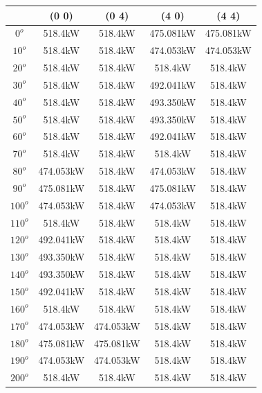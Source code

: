         \singlespacing
        \begin{table}[H]
        	\centering
        	\begin{tabular}{|c|c|c|c|c|} \hline
        			& (0 0)		& (0 4)		& (4 0)		& (4 4)		\\ \hline
        		$0^o$	& 518.4kW	& 518.4kW	& 475.081kW	& 475.081kW	\\ \hline
        		$10^o$	& 518.4kW	& 518.4kW	& 474.053kW	& 474.053kW	\\ \hline
        		$20^o$	& 518.4kW	& 518.4kW	& 518.4kW	& 518.4kW	\\ \hline
        		$30^o$	& 518.4kW	& 518.4kW	& 492.041kW	& 518.4kW	\\ \hline
        		$40^o$	& 518.4kW	& 518.4kW	& 493.350kW	& 518.4kW	\\ \hline
        		$50^o$	& 518.4kW	& 518.4kW	& 493.350kW	& 518.4kW	\\ \hline
        		$60^o$	& 518.4kW	& 518.4kW	& 492.041kW	& 518.4kW	\\ \hline
        		$70^o$	& 518.4kW	& 518.4kW	& 518.4kW	& 518.4kW	\\ \hline
        		$80^o$	& 474.053kW	& 518.4kW	& 474.053kW	& 518.4kW	\\ \hline
        		$90^o$	& 475.081kW	& 518.4kW	& 475.081kW	& 518.4kW	\\ \hline
        		$100^o$	& 474.053kW	& 518.4kW	& 474.053kW	& 518.4kW	\\ \hline
        		$110^o$	& 518.4kW	& 518.4kW	& 518.4kW	& 518.4kW	\\ \hline
        		$120^o$	& 492.041kW	& 518.4kW	& 518.4kW	& 518.4kW	\\ \hline
        		$130^o$	& 493.350kW	& 518.4kW	& 518.4kW	& 518.4kW	\\ \hline
        		$140^o$	& 493.350kW	& 518.4kW	& 518.4kW	& 518.4kW	\\ \hline
        		$150^o$	& 492.041kW	& 518.4kW	& 518.4kW	& 518.4kW	\\ \hline
        		$160^o$	& 518.4kW	& 518.4kW	& 518.4kW	& 518.4kW	\\ \hline
        		$170^o$	& 474.053kW	& 474.053kW	& 518.4kW	& 518.4kW	\\ \hline
        		$180^o$	& 475.081kW	& 475.081kW	& 518.4kW	& 518.4kW	\\ \hline
        		$190^o$	& 474.053kW	& 474.053kW	& 518.4kW	& 518.4kW	\\ \hline
        		$200^o$	& 518.4kW	& 518.4kW	& 518.4kW	& 518.4kW	\\ \hline

\end{tabular}
\end{table}
